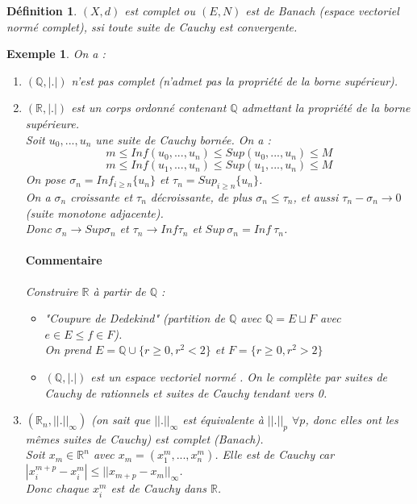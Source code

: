 \documentclass[a4paper, oneside]{report}
\theoremstyle{break}
\newtheorem{defi}[thm]{Définition}
\newtheorem{exem}[thm]{Exemple}
\newcommand{\R}{\mathbb{R}}
\newcommand{\Q}{\mathbb{Q}}
\newcommand{\evn}{espace vectoriel normé }
\begin{document}
\begin{defi}                    

$(X,d)$ est complet ou $(E,N)$ est de Banach (espace vectoriel normé complet), ssi toute suite de Cauchy est convergente.
\end{defi}

\begin{exem}

On a :
\begin{enumerate}
\item $(\Q, |.|)$ n'est pas complet (n'admet pas la propriété de la borne supérieur).
\item $(\R, |.|)$ est un corps ordonné contenant $\Q$ admettant la propriété de la borne supérieure.\\
Soit $u_0,...,u_n$ une suite de Cauchy bornée. On a :
$$m\leq Inf(u_0,...,u_n)\leq Sup(u_0,...,u_n)\leq M$$
$$m\leq Inf(u_1,...,u_n)\leq Sup(u_1,...,u_n)\leq M$$
On pose $\sigma_n=Inf_{i\geq n}\{u_n\}$ et $\tau_n=Sup_{i\geq n}\{u_n\}$.\\
On a $\sigma_n$ croissante et $\tau_n$ décroissante, de plus $\sigma_n \leq \tau_n$, et aussi $\tau_n - \sigma_n \rightarrow 0$ (suite monotone adjacente).\\
Donc $\sigma_n \rightarrow Sup\sigma_n$ et $\tau_n \rightarrow Inf \tau_n$ et $Sup~\sigma_n = Inf~\tau_n$.

\paragraph{Commentaire}
Construire $\R$ à partir de $\Q$ :
\begin{itemize}
\item "Coupure de Dedekind" (partition de $\Q$ avec $\Q=E\sqcup F$ avec $e\in E \leq f\in F$).\\
On prend $E=\Q \cup \{r\geq 0, r^2<2 \}$ et $F=\{r\geq 0, r^2>2 \}$

\item $(\Q, |.|)$ est un \evn. On le complète par {suites de Cauchy de rationnels} et {suites de Cauchy tendant vers 0}.
\end{itemize}

\item $(\R_n, ||.||_\infty)$ (on sait que $||.||_\infty$ est équivalente à $||.||_p$ $\forall p$, donc elles ont les mêmes suites de Cauchy) est complet (Banach).\\
Soit $x_m \in \R^n$ avec $x_m=(x_1^m,...,x_n^m)$. Elle est de Cauchy car $|x_i^{m+p}-x_i^m| \leq ||x_{m+p}-x_m||_\infty$.\\
Donc chaque $x_i^m$ est de Cauchy dans $\R$.


\end{enumerate}
\end{exem}
\end{document}
